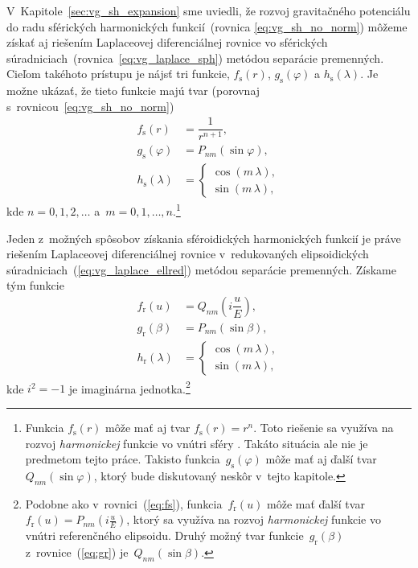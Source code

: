 \documentclass[a4paper, 12pt]{book}
\begin{document}
V~Kapitole~\ref{sec:vg_sh_expansion} sme uviedli, že rozvoj gravitačného 
potenciálu do radu sférických harmonických funkcií~(rovnica 
\ref{eq:vg_sh_no_norm}) môžeme získať aj riešením Laplaceovej diferenciálnej 
rovnice vo sférických súradniciach~(rovnica~\ref{eq:vg_laplace_sph}) metódou 
separácie premenných.  Cieľom takéhoto prístupu je nájsť tri funkcie, 
$f_{\mathrm{s}}(r)$, $g_{\mathrm{s}}(\varphi)$ a $h_{\mathrm{s}}(\lambda)$.  Je 
možne ukázať, že tieto funkcie majú tvar (porovnaj 
s~rovnicou~\ref{eq:vg_sh_no_norm})
%
\begin{align}
\label{eq:fs}
f_{\mathrm{s}}(r) &= \dfrac{1}{r^{n + 1}}{,}\\
%
\label{eq:gs}
g_{\mathrm{s}}(\varphi) &= P_{nm}(\sin\varphi){,}\\
%
\label{eq:hs}
h_{\mathrm{s}}(\lambda) &=
%
\begin{cases}
\cos(m\,\lambda){,}\\
\sin(m\,\lambda){,}
\end{cases}
\end{align}
%
kde $n = 0, 1, 2, \dots$ a~$m = 0, 1, \dots, n$.\footnote{Funkcia 
$f_{\mathrm{s}}(r)$ môže mať aj tvar $f_{\mathrm{s}}(r) = r^n$.  Toto riešenie 
sa využíva na rozvoj \emph{harmonickej} funkcie vo vnútri sféry 
\parencite{MoritzPhysicalGeodesy}.  Takáto situácia ale nie je predmetom tejto 
práce.  Takisto funkcia~$g_\mathrm{s}(\varphi)$ môže mať aj ďalší 
tvar~$Q_{nm}(\sin\varphi)$, ktorý bude diskutovaný neskôr v~tejto kapitole.}

Jeden z~možných spôsobov získania sféroidických harmonických funkcií je práve 
riešením Laplaceovej diferenciálnej rovnice v~redukovaných elipsoidických 
súradniciach~(\ref{eq:vg_laplace_ellred}) metódou separácie premenných.  
Získame tým funkcie \parencite{MoritzPhysicalGeodesy}
%
\begin{align}
\label{eq:fr}
f_{\mathrm{r}}(u) &=
Q_{nm}\left( i \dfrac{u}{E} \right){,}\\
%
\label{eq:gr}
g_{\mathrm{r}}(\beta) &= P_{nm}(\sin\beta){,}\\
%
\label{eq:hr}
h_{\mathrm{r}}(\lambda) &=
%
\begin{cases}
\cos(m\,\lambda){,}\\
\sin(m\,\lambda){,}
\end{cases}
\end{align}
%
kde $i^2 = -1$ je imaginárna jednotka.\footnote{Podobne ako 
v~rovnici~(\ref{eq:fs}), funkcia~$f_{\mathrm{r}}(u)$ môže mať ďalší tvar 
$f_{\mathrm{r}}(u) = P_{nm}\left( i \frac{u}{E} \right)$, ktorý sa využíva na 
rozvoj \emph{harmonickej} funkcie vo vnútri referenčného elipsoidu.  Druhý 
možný tvar funkcie~$g_\mathrm{r}(\beta)$ z~rovnice~(\ref{eq:gr}) 
je~$Q_{nm}(\sin\beta)$.}
\end{document}
